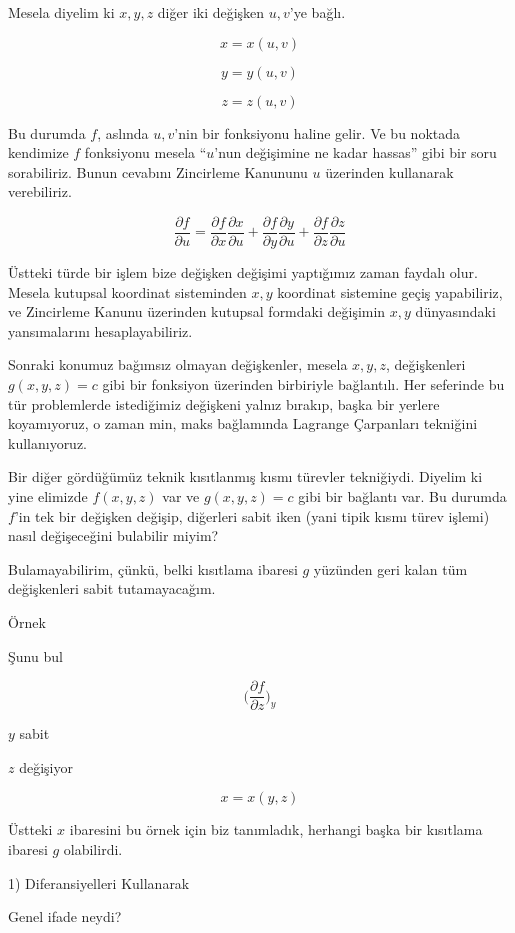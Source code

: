\documentclass[12pt,fleqn]{article}\usepackage{../../common}
\begin{document}
Mesela diyelim ki $x,y,z$ diğer iki değişken $u,v$'ye bağlı. 

$$ x = x(u,v) $$

$$ y = y(u,v) $$

$$ z = z(u,v) $$

Bu durumda $f$, aslında $u,v$'nin bir fonksiyonu haline gelir. Ve bu
noktada kendimize $f$ fonksiyonu mesela ``$u$'nun değişimine ne kadar
hassas'' gibi bir soru sorabiliriz. Bunun cevabını Zincirleme Kanununu $u$
üzerinden kullanarak verebiliriz.

$$ 
\frac{\partial f}{\partial u} = 
\frac{\partial f}{\partial x}\frac{\partial x}{\partial u} + 
\frac{\partial f}{\partial y}\frac{\partial y}{\partial u} + 
\frac{\partial f}{\partial z}\frac{\partial z}{\partial u} 
$$

Üstteki türde bir işlem bize değişken değişimi yaptığımız zaman faydalı
olur. Mesela kutupsal koordinat sisteminden $x,y$ koordinat sistemine geçiş
yapabiliriz, ve Zincirleme Kanunu üzerinden kutupsal formdaki değişimin $x,y$
dünyasındaki yansımalarını hesaplayabiliriz. 

Sonraki konumuz bağımsız olmayan değişkenler, mesela $x,y,z$, değişkenleri
$g(x,y,z)=c$ gibi bir fonksiyon üzerinden birbiriyle bağlantılı. Her
seferinde bu tür problemlerde istediğimiz değişkeni yalnız bırakıp, başka
bir yerlere koyamıyoruz, o zaman min, maks bağlamında Lagrange Çarpanları
tekniğini kullanıyoruz.

Bir diğer gördüğümüz teknik kısıtlanmış kısmı türevler tekniğiydi. Diyelim
ki yine elimizde $f(x,y,z)$ var ve $g(x,y,z)=c$ gibi bir bağlantı var. Bu
durumda $f$'in tek bir değişken değişip, diğerleri sabit iken (yani tipik
kısmı türev işlemi) nasıl değişeceğini bulabilir miyim? 

Bulamayabilirim, çünkü, belki kısıtlama ibaresi $g$ yüzünden geri kalan tüm
değişkenleri sabit tutamayacağım.

Örnek 

Şunu bul

$$ 
\bigg( 
\frac{\partial f}{\partial z}
\bigg)_{y}
$$

$y$ sabit

$z$ değişiyor

$$ x = x(y,z) $$

Üstteki $x$ ibaresini bu örnek için biz tanımladık, herhangi başka bir
kısıtlama ibaresi $g$ olabilirdi. 

1) Diferansiyelleri Kullanarak

Genel ifade neydi?
\end{document}
